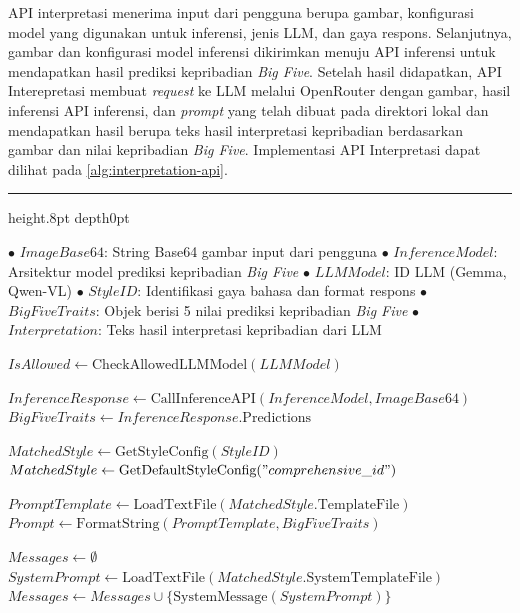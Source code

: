 API interpretasi menerima input dari pengguna berupa gambar, konfigurasi model yang digunakan untuk inferensi, jenis LLM, dan gaya respons. Selanjutnya, gambar dan konfigurasi model inferensi dikirimkan menuju API inferensi untuk mendapatkan hasil prediksi kepribadian \textit{Big Five}. Setelah hasil didapatkan, API Interepretasi membuat \textit{request} ke LLM melalui OpenRouter dengan gambar, hasil inferensi API inferensi, dan \textit{prompt} yang telah dibuat pada direktori lokal dan mendapatkan hasil berupa teks hasil interpretasi kepribadian berdasarkan gambar dan nilai kepribadian \textit{Big Five}. Implementasi API Interpretasi dapat dilihat pada \autoref{alg:interpretation-api}. 

{
	\vspace{2ex}
	\hrule height.8pt depth0pt \kern5pt
	
	\begin{algorithmic}[1]
		\Input 
		\Statex $\bullet$ $ImageBase64$: String Base64 gambar input dari pengguna
		\Statex $\bullet$ $InferenceModel$: Arsitektur model prediksi kepribadian \textit{Big Five}
		\Statex $\bullet$ $LLMModel$: ID LLM (Gemma, Qwen-VL)
		\Statex $\bullet$ $StyleID$: Identifikasi gaya bahasa dan format respons
		\Output 
		\Statex $\bullet$ $BigFiveTraits$: Objek berisi 5 nilai prediksi kepribadian \textit{Big Five}
		\Statex $\bullet$ $Interpretation$: Teks hasil interpretasi kepribadian dari LLM
		
		\State $IsAllowed \gets \text{CheckAllowedLLMModel}(LLMModel)$
		\State \Return {}
		\EndIf
		
		\State $InferenceResponse \gets \text{CallInferenceAPI}(InferenceModel, ImageBase64)$ 
		\State $BigFiveTraits \gets InferenceResponse.\text{Predictions}$
		
		\State $MatchedStyle \gets \text{GetStyleConfig}(StyleID)$
		\State $MatchedStyle \gets \text{GetDefaultStyleConfig}("comprehensive\_id")$
		\EndIf
		
		\State $PromptTemplate \gets \text{LoadTextFile}(MatchedStyle.\text{TemplateFile})$
		\State $Prompt \gets \text{FormatString}(PromptTemplate, BigFiveTraits)$ 
		
		\State $Messages \gets \emptyset$
		\State $SystemPrompt \gets \text{LoadTextFile}(MatchedStyle.\text{SystemTemplateFile})$
		\State $Messages \gets Messages \cup \{\text{SystemMessage}(SystemPrompt)\}$
		\EndIf
		

\end{algorithmic}}
